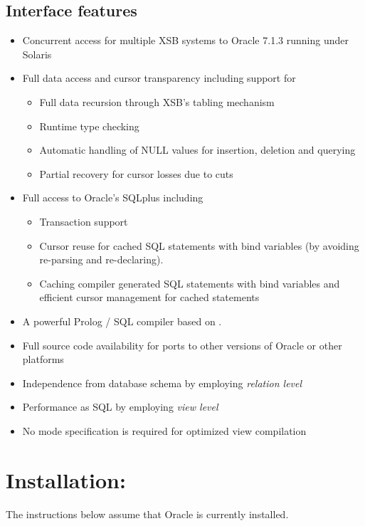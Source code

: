 \subsection{Interface features}
\begin{itemize} 
\item Concurrent access for multiple XSB systems to Oracle 7.1.3
	running under Solaris
\item Full data access and cursor transparency including support for
	\begin{itemize}
	\item Full data recursion through XSB's tabling mechanism
	\item Runtime type checking
	\item Automatic handling of NULL values for insertion, 
		deletion and querying
	\item Partial recovery for cursor losses due to cuts
	\end{itemize}
\item Full access to Oracle's SQLplus including
	\begin{itemize}
	\item Transaction support
	\item Cursor reuse for cached SQL statements 
		with bind variables (by avoiding re-parsing and re-declaring).
	\item Caching compiler generated SQL statements with bind variables 
		and efficient cursor management for cached statements
	\end{itemize}
\item A powerful Prolog / SQL compiler based on \cite{Drax92}.
\item Full source code availability for ports to other versions of
      Oracle or other platforms
\item Independence from database schema by employing {\it relation level}
\item Performance as SQL by employing {\it view level} 
\item No mode specification is required for optimized view compilation
\end{itemize}

\section{Installation:}

The instructions below assume that Oracle is currently installed.

